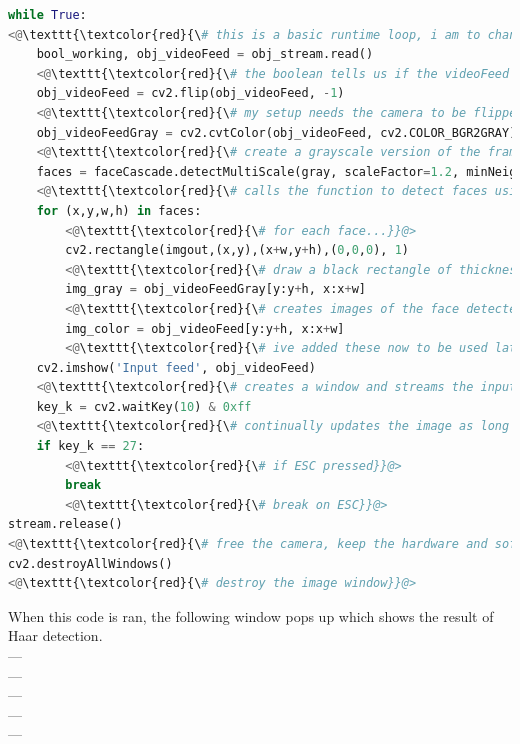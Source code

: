 \documentclass[9pt]{article}
\begin{document}
\begin{lstlisting}[language=Python]
while True:
<@\texttt{\textcolor{red}{\# this is a basic runtime loop, i am to change this when i add the web interface to call this as a function}}@> 
	bool_working, obj_videoFeed = obj_stream.read() 
	<@\texttt{\textcolor{red}{\# the boolean tells us if the videoFeed could be read correctly, and the other variable contains images from the camera}}@> 
	obj_videoFeed = cv2.flip(obj_videoFeed, -1)
	<@\texttt{\textcolor{red}{\# my setup needs the camera to be flipped due to its placement}}@> 
	obj_videoFeedGray = cv2.cvtColor(obj_videoFeed, cv2.COLOR_BGR2GRAY)
	<@\texttt{\textcolor{red}{\# create a grayscale version of the frames captured using the OpenCV conversion}}@> 
	faces = faceCascade.detectMultiScale(gray, scaleFactor=1.2, minNeighbors=5, minSize=(30, 30))
	<@\texttt{\textcolor{red}{\# calls the function to detect faces using the Haar Cascade, applied to the gray image}}@> 
	for (x,y,w,h) in faces:
		<@\texttt{\textcolor{red}{\# for each face...}}@> 
		cv2.rectangle(imgout,(x,y),(x+w,y+h),(0,0,0), 1) 
		<@\texttt{\textcolor{red}{\# draw a black rectangle of thickness 1 as a bounding box around the face}}@>
		img_gray = obj_videoFeedGray[y:y+h, x:x+w]
		<@\texttt{\textcolor{red}{\# creates images of the face detected in greyscale and in color}}@> 
		img_color = obj_videoFeed[y:y+h, x:x+w]
		<@\texttt{\textcolor{red}{\# ive added these now to be used later when saving photos of unknown people, just for testing at the moment}}@> 
	cv2.imshow('Input feed', obj_videoFeed) 
	<@\texttt{\textcolor{red}{\# creates a window and streams the input from the camera from the variable imgout}}@>
	key_k = cv2.waitKey(10) & 0xff
	<@\texttt{\textcolor{red}{\# continually updates the image as long as ESC isnt pressed}}@> 
	if key_k == 27:
		<@\texttt{\textcolor{red}{\# if ESC pressed}}@>
		break
		<@\texttt{\textcolor{red}{\# break on ESC}}@> 
stream.release()
<@\texttt{\textcolor{red}{\# free the camera, keep the hardware and software (mainly memory) tidy, this prevents errors with the camera being in-use whilst we try to run the code}}@> 
cv2.destroyAllWindows()
<@\texttt{\textcolor{red}{\# destroy the image window}}@> 

\end{lstlisting}
When this code is ran, the following window pops up which shows the result of Haar detection.
\\
---\\
---\\
---\\
---\\
---\\
\end{document}
